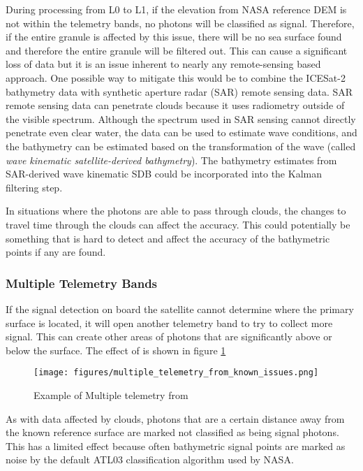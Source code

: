 During processing from L0 to L1, if the elevation from NASA reference DEM is not within the telemetry bands, no photons will be classified as signal. Therefore, if the entire granule is affected by this issue, there will be no sea surface found and therefore the entire granule will be filtered out. This can cause a significant loss of data but it is an issue inherent to nearly any remote-sensing based approach. One possible way to mitigate this would be to combine the ICESat-2 bathymetry data with synthetic aperture radar (SAR) remote sensing data. SAR remote sensing data can penetrate clouds because it uses radiometry outside of the visible spectrum. Although the spectrum used in SAR sensing cannot directly penetrate even clear water, the data can be used to estimate wave conditions, and the bathymetry can be estimated based on the transformation of the wave (called \emph{wave kinematic satellite-derived bathymetry}). The bathymetry estimates from SAR-derived wave kinematic SDB could be incorporated into the Kalman filtering step. 

In situations where the photons are able to pass through clouds, the changes to travel time through the clouds can affect the accuracy. This could potentially be something that is hard to detect and affect the accuracy of the bathymetric points if any are found.
 

\subsubsection{Multiple Telemetry Bands}

If the signal detection on board the satellite cannot determine where the primary surface is located, it will open another telemetry band to try to collect more signal. This can create other areas of photons that are significantly above or below the surface. The effect of is shown in figure \ref{fig:multiple_tel_bands}

\begin{figure}[h!]
    \centering
    \texttt{[image: figures/multiple\_telemetry\_from\_known\_issues.png]}
    \caption{Example of Multiple telemetry from \cite{atl03knownissues}}
    \label{fig:multiple_tel_bands}
\end{figure}

As with data affected by clouds, photons that are a certain distance away from the known reference surface are marked not classified as being signal photons. This has a limited effect because often bathymetric signal points are marked as noise by the default ATL03 classification algorithm used by NASA. 

